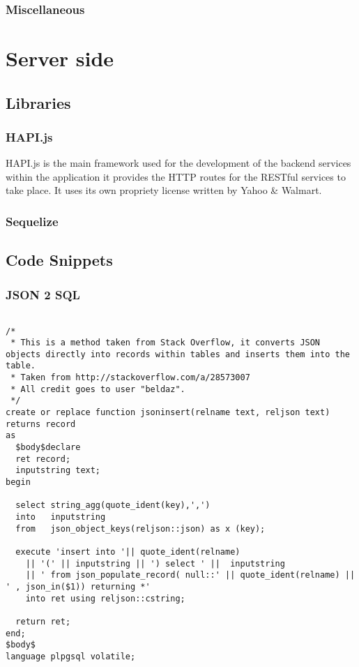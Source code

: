 \subsubsection*{Miscellaneous}



\section{Server side}


\subsection{Libraries}

\subsubsection*{HAPI.js}

HAPI.js \cite{hapiteam:hapti:2015:online} is the main framework used for the development of the backend services within the application it provides the HTTP routes for the RESTful services to take place. It uses its own propriety license written by Yahoo \& Walmart.

\subsubsection*{Sequelize}


\subsection{Code Snippets}

\subsubsection*{JSON 2 SQL}

\lstsql
\begin{lstlisting}

/*
 * This is a method taken from Stack Overflow, it converts JSON objects directly into records within tables and inserts them into the table.
 * Taken from http://stackoverflow.com/a/28573007 
 * All credit goes to user "beldaz".
 */
create or replace function jsoninsert(relname text, reljson text) returns record 
as
  $body$declare
  ret record;
  inputstring text;
begin

  select string_agg(quote_ident(key),',') 
  into   inputstring
  from   json_object_keys(reljson::json) as x (key);

  execute 'insert into '|| quote_ident(relname) 
    || '(' || inputstring || ') select ' ||  inputstring 
    || ' from json_populate_record( null::' || quote_ident(relname) || ' , json_in($1)) returning *'
    into ret using reljson::cstring;

  return ret;
end;
$body$
language plpgsql volatile;

\end{lstlisting}


